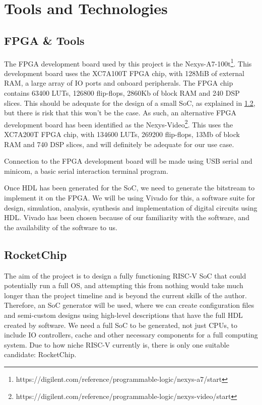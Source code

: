 \chapter{Tools and Technologies}
\label{ch:tools_technologies}
\section{FPGA \& Tools}
The FPGA development board used by this project is the Nexys-A7-100t\footnote{https://digilent.com/reference/programmable-logic/nexys-a7/start}. This development board uses the XC7A100T FPGA chip, with 128MiB of external RAM, a large array of IO ports and onboard peripherals. The FPGA chip contains 63400 LUTs, 126800 flip-flops, 2860Kb of block RAM and 240 DSP slices\cite{nexys-a7-100t}. This should be adequate for the design of a small SoC, as explained in \ref{rocketchip}, but there is risk that this won't be the case. As such, an alternative FPGA development board has been identified as the Nexys-Video\footnote{https://digilent.com/reference/programmable-logic/nexys-video/start}. This uses the XC7A200T FPGA chip, with 134600 LUTs, 269200 flip-flops, 13Mb of block RAM and 740 DSP slices\cite{nexys-video}, and will definitely be adequate for our use case.

Connection to the FPGA development board will be made using USB serial and minicom\cite{minicom}, a basic serial interaction terminal program.

Once HDL has been generated for the SoC, we need to generate the bitstream to implement it on the FPGA. We will be using Vivado for this, a software suite for design, simulation, analysis, synthesis and implementation of digital circuits using HDL. Vivado has been chosen because of our familiarity with the software, and the availability of the software to us.

\section{RocketChip} %
\label{rocketchip}
The aim of the project is to design a fully functioning RISC-V SoC that could potentially run a full OS, and attempting this from nothing would take much longer than the project timeline and is beyond the current skills of the author. Therefore, an SoC generator will be used, where we can create configuration files and semi-custom designs using high-level descriptions that have the full HDL created by software. We need a full SoC to be generated, not just CPUs, to include IO controllers, cache and other necessary components for a full computing system. Due to how niche RISC-V currently is, there is only one suitable candidate: RocketChip\cite{rocketchip}.

